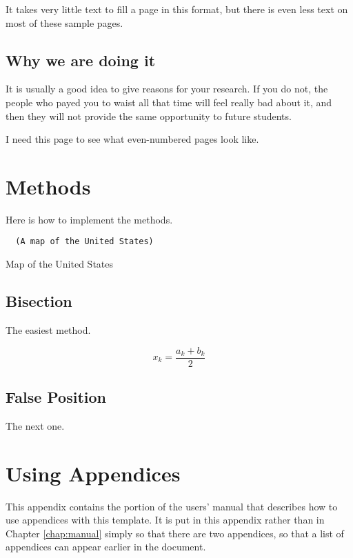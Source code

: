 \documentclass[thesis]{../cls/thesis-umich}
\begin{document}
\newpage

It takes very little text to fill a page in this format, but there is even less text on most of these sample pages.

\section{Why we are doing it}
It is usually a good idea to give reasons for your research.  If you do not, the people who payed you to waist all that time will feel really bad about it, and then they will not provide the same opportunity to future students.

\newpage

I need this page to see what even-numbered pages look like.

\appendix
\chapter{Methods}
Here is how to implement the methods.

\begin{program}
 \begin{verbatim}
  (A map of the United States)
 \end{verbatim}
 \caption{Map of the United States}
\end{program}

\section{Bisection}
The easiest method.

\begin{equation}
x_k = \frac{a_k+b_k}{2}
\end{equation}

\section{False Position}
The next one.


\chapter{Using Appendices}    \label{app:appendix}
This appendix contains the portion of the users' manual that describes
how to use appendices with this template.  It is put in this appendix
rather than in Chapter \ref{chap:manual} simply so that there are two
appendices, so that a list of appendices can appear earlier in the
document.
\end{document}
